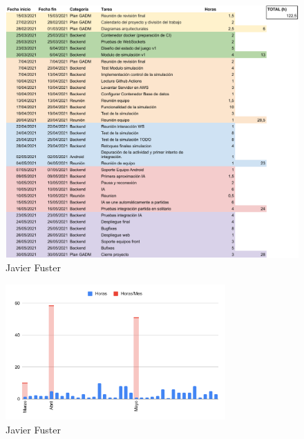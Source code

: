 \documentclass{article}
\begin{document}
\begin{figure}[h]
    \centering
    \includegraphics[width=\textwidth]{../images/horasTrabajadas/javier-fuster.pdf}
    \caption{Javier Fuster}
\end{figure}

\begin{figure}[h]
    \centering
    \includegraphics[width=0.75\textwidth]{../images/graficos/FUSTER}
    \caption{Javier Fuster}
\end{figure}
\end{document}
